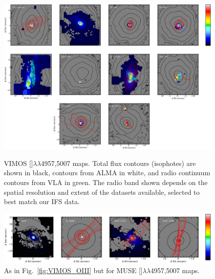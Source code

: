 		\begin{figure}
			\centering
			\includegraphics[width=\textwidth]{chapter5/vimos/Hb.png}
			\caption[VIMOS  maps]{VIMOS []$\lambda\lambda$4957,5007 maps. Total flux contours (isophotes) are shown in black,  contours from ALMA in white, and radio continuum contours from VLA in green. The radio band shown depends on the spatial resolution and extent of the datasets available, selected to best match our IFS data.\label{fig:VIMOS_OIII}} 
			
			\vspace{\floatsep}
			\includegraphics[width=\textwidth]{chapter5/muse/Hb.png}
			\caption[MUSE  maps]{As in Fig.\ \ref{fig:VIMOS_OIII} but for MUSE []$\lambda\lambda$4957,5007 maps.\label{fig:MUSE_OIII}} 
			
		\end{figure}

